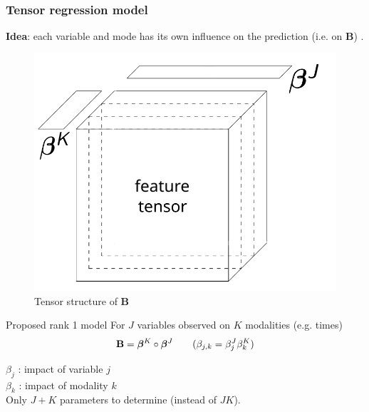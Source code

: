 \documentclass{beamer}
\begin{document}





\begin{frame}
    \frametitle{Tensor regression model}
    \textbf{Idea}: each variable and mode has its own influence on the prediction (i.e. on $\mathbf{B}$) \cite{multi_rank_1}.\\[10 pt]
    \begin{overprint}
    \begin{figure}
        \centering
        \includegraphics[scale = 0.3]{images/beta_tens.png}
        \caption{Tensor structure of $\mathbf{B}$}
    \end{figure}
    \begin{block}{Proposed rank 1 model}
    For $J$ variables observed on $K$ modalities (e.g. times)
    $$ \mathbf{B} = \bm{\beta}^K \circ \bm{\beta}^J \hspace{0.7 cm}  (\beta_{j,k} = \beta_j^J\beta_{k}^{K})$$
    \end{block}
    $\beta_j$ : impact of variable $j$\\[5 pt]
    $\beta_k$ : impact of modality $k$\\[10 pt]
    Only $J+K$ parameters to determine (instead of $JK$).
    
\end{overprint}
\end{frame}
\end{document}
